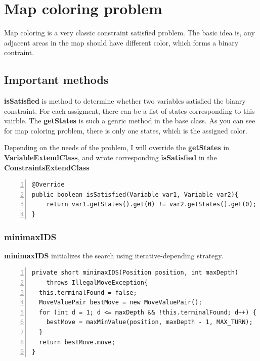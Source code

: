 \documentclass{article}
\begin{document}
\section{Map coloring problem}
Map coloring is a very classic constraint satisfied problem. The basic idea is, any adjacent areas in the map should have different color, which forms a binary contraint.

\subsection{Important methods}
\textbf{isSatisfied} is method to determine whether two variables satisfied the bianry constraint. For each assigment, there can be a list of states corresponding to this vairble. The \textbf{getStates} is such a genric method in the base class. As you can see for map coloring problem, there is only one states, which is the assigned color.

Depending on the needs of the problem, I will override the \textbf{getStates} in \textbf{VariableExtendClass}, and wrote corresponding \textbf{isSatisfied} in the \textbf{ConstraintsExtendClass}
\begin{lstlisting}[numbers=left]   
@Override
public boolean isSatisfied(Variable var1, Variable var2){
    return var1.getStates().get(0) != var2.getStates().get(0);
}
\end{lstlisting}


















\subsubsection{minimaxIDS}

\textbf{minimaxIDS} initializes the search using iterative-depending strategy.


\begin{lstlisting}[numbers=left]
private short minimaxIDS(Position position, int maxDepth) 
    throws IllegalMoveException{
  this.terminalFound = false;
  MoveValuePair bestMove = new MoveValuePair();
  for (int d = 1; d <= maxDepth && !this.terminalFound; d++) {
    bestMove = maxMinValue(position, maxDepth - 1, MAX_TURN);
  }
  return bestMove.move;
}
\end{lstlisting}
\end{document}
